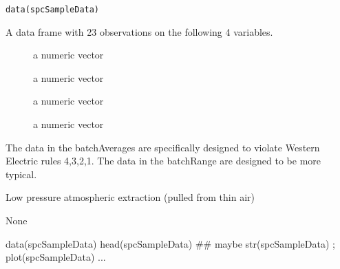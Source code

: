 \documentclass[a4paper]{book}
\begin{document}
%
\begin{Usage}
\begin{verbatim}
data(spcSampleData)
\end{verbatim}
\end{Usage}
%
\begin{Format}
A data frame with 23 observations on the following 4 variables.
\begin{description}

\item[] a numeric vector
\item[] a numeric vector
\item[] a numeric vector
\item[] a numeric vector

\end{description}

\end{Format}
%
\begin{Details}\relax
The data in the batchAverages are specifically designed to violate Western Electric rules 4,3,2,1.  The data in the batchRange are designed to be more
typical.
\end{Details}
%
\begin{Source}\relax
Low pressure atmospheric extraction (pulled from thin air)
\end{Source}
%
\begin{References}\relax
None
\end{References}
%
\begin{Examples}
\begin{ExampleCode}
data(spcSampleData)
head(spcSampleData)
## maybe str(spcSampleData) ; plot(spcSampleData) ...
\end{ExampleCode}
\end{Examples}
\printindex{}
\end{document}
